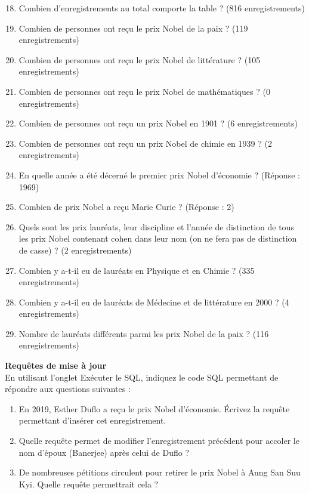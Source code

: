 \begin{exercice}
    \begin{enumerate}
        \setcounter{enumi}{17}
        \item  Combien d'enregistrements au total comporte la table ? (816 enregistrements)
        \item  Combien de personnes ont reçu le prix Nobel de la paix ? (119 enregistrements)
        \item  Combien de personnes ont reçu le prix Nobel de littérature ? (105 enregistrements)
        \item  Combien de personnes ont reçu le prix Nobel de mathématiques ? (0 enregistrements)
        \item  Combien de personnes ont reçu un prix Nobel en 1901 ? (6 enregistrements)
        \item  Combien de personnes ont reçu un prix Nobel de chimie en 1939 ? (2 enregistrements)
        \item  En quelle année a été décerné le premier prix Nobel d'économie ? (Réponse : 1969)
        \item  Combien de prix Nobel a reçu Marie Curie ? (Réponse : 2)
        \item  Quels sont les prix lauréats, leur discipline et l'année de distinction de tous les prix Nobel contenant cohen dans leur nom (on ne fera pas de distinction de casse) ? (2 enregistrements)
        \item  Combien y a-t-il eu de lauréats en Physique et en Chimie ? (335 enregistrements)
        \item  Combien y a-t-il eu de lauréats de Médecine et de littérature en 2000 ? (4 enregistrements)
        \item  Nombre de lauréats différents parmi les prix Nobel de la paix ? (116 enregistrements)\\
    \end{enumerate}
    
    \textbf{Requêtes de mise à jour}\\
    \setcounter{enumi}{29}
    En utilisant l'onglet Exécuter le SQL, indiquez le code SQL permettant de répondre aux questions suivantes :\\
    
    \begin{enumerate}
        \item En 2019, Esther Duflo a reçu le prix Nobel d'économie. Écrivez la requête permettant d'insérer cet enregistrement.
        \item  Quelle requête permet de modifier l'enregistrement précédent pour accoler le nom d'époux (Banerjee) après celui de Duflo ?
        \item   De nombreuses pétitions circulent pour retirer le prix Nobel à Aung San Suu Kyi. Quelle requête permettrait cela ?
    \end{enumerate}
\end{exercice}






